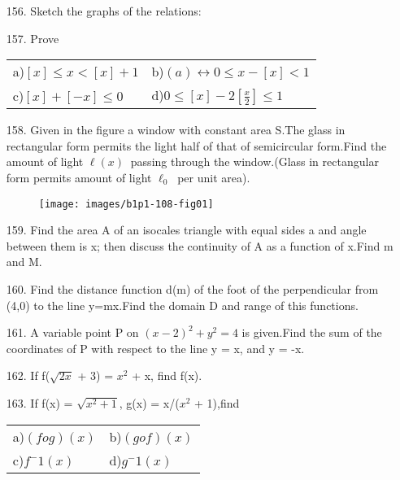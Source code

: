 \documentclass[11pt]{amsbook}
\begin{document}
\begin{enumerate}
\item[156.]
Sketch the graphs of the relations:
\item[157.]
Prove

\begin{tabular}{ll}
 a)$[x]\leq x<[x]+1$
 &b)$(a)\leftrightarrow 0\leq x-[x]<1$\\
 c)$[x]+[-x]\leq0$ 
 &d)$0\leq[x]-2[\frac{x}{2}]\leq1$
\end{tabular}
\item[158.]
Given in the figure a window with constant area S.The glass in rectangular form permits the light half of that of semicircular form.Find the amount of light $ \ell(x)\ $ passing through the window.(Glass in rectangular form permits amount of light $ \ell_0\ $ per unit area).
\begin{figure}[htb]
\begin{center}
\texttt{[image: images/b1p1-108-fig01]}
\end{center}
\end{figure}
\item[159.]
Find the area A of an isocales triangle with equal sides a and angle between them is x; then discuss the continuity of A as a function of x.Find m and M.
\item[160.]
Find the distance function d(m) of the foot of the perpendicular from (4,0) to the line y=mx.Find the domain D and range of this functions.
\item[161.]
A variable point P on $ (x - 2)^2 + y^2 = 4 $ is given.Find the sum of the coordinates of P with respect to the line y = x, and y = -x.
\item[162.]
If f($\sqrt{2x}$ + 3) = $x^2$ + x, find f(x).
\item[163.]
If f(x) = $\sqrt{x^2 + 1}$, g(x) = x/($ x^2 $ + 1),find 

\begin{tabular}{ll}
 a)$(fog)(x) $
 &b)$(gof)(x) $\\
 c)$f^-1(x)$
 &d)$g^-1(x) $
\end{tabular}
\end{enumerate}
\end{document}
